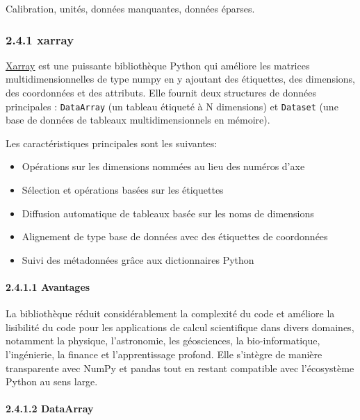 \documentclass[
]{article}
\begin{document}
Calibration, unités, données manquantes, données éparses.

\subsubsection{\texorpdfstring{{2.4.1}
xarray}{2.4.1 xarray}}\label{xarray}

\href{https://docs.xarray.dev/en/latest/getting-started-guide/why-xarray.html}{Xarray}
est une puissante bibliothèque Python qui améliore les matrices
multidimensionnelles de type numpy en y ajoutant des étiquettes, des
dimensions, des coordonnées et des attributs. Elle fournit deux
structures de données principales : \texttt{DataArray} (un tableau
étiqueté à N dimensions) et \texttt{Dataset} (une base de données de
tableaux multidimensionnels en mémoire).

Les caractéristiques principales sont les suivantes:

\begin{itemize}
\item
  Opérations sur les dimensions nommées au lieu des numéros d'axe
\item
  Sélection et opérations basées sur les étiquettes
\item
  Diffusion automatique de tableaux basée sur les noms de dimensions
\item
  Alignement de type base de données avec des étiquettes de coordonnées
\item
  Suivi des métadonnées grâce aux dictionnaires Python
\end{itemize}

\paragraph{\texorpdfstring{{2.4.1.1}
Avantages}{2.4.1.1 Avantages}}\label{avantages}

La bibliothèque réduit considérablement la complexité du code et
améliore la lisibilité du code pour les applications de calcul
scientifique dans divers domaines, notamment la physique, l'astronomie,
les géosciences, la bio-informatique, l'ingénierie, la finance et
l'apprentissage profond. Elle s'intègre de manière transparente avec
NumPy et pandas tout en restant compatible avec l'écosystème Python au
sens large.

\paragraph{\texorpdfstring{{2.4.1.2}
DataArray}{2.4.1.2 DataArray}}\label{dataarray}
\end{document}
